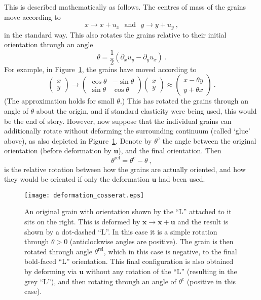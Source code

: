 \documentclass[]{scrreprt}
\newcommand{\mand}{\ \ \ \mbox{and}\ \ \ }
\newcommand{\pl}{\partial}
\newcommand{\ha}{\mbox{$\frac{1}{2}$}}
\newcommand{\thetac}{\theta^{\mathrm{c}}}
\newcommand{\thetarel}{\theta^{\mathrm{rel}}}
\begin{document}
This is described mathematically as follows.  The centres of mass of
the grains move according to
$$
x \rightarrow x + u_{x} \mand y\rightarrow y+ u_{y} \ ,
$$
in the standard way.  This also rotates the grains relative to their
initial orientation through an angle
$$
\theta = \ha(\pl_{x}u_{y}-\pl_{y}u_{x}) \ .
$$
For example, in Figure~\ref{deformation_cosserat.fig}, the grains have
moved according to
\begin{equation}
\left(\begin{array}{c}x\\y\end{array}\right) \rightarrow
\left(\begin{array}{cc}\cos\theta & -\sin\theta \\ \sin\theta & \cos\theta
\end{array}\right) 
\left(\begin{array}{c}x\\y\end{array}\right) 
\approx
\left(\begin{array}{c}x - \theta y\\y + \theta x\end{array}\right)   \ .
\label{rigid.rot.eqn}
\end{equation}
(The approximation holds for small $\theta$.)  This has rotated the
grains through an angle of $\theta$ about the origin, and if standard
elasticity were being used, this would be the end of story.  However,
now suppose that the individual grains can additionally rotate without
deforming the surrounding continuum (called `glue' above), as also
depicted in Figure~\ref{deformation_cosserat.fig}.  Denote by
$\thetac$ the angle between the original orientation (before
deformation by ${\mathbf u}$), and the final orientation.  Then
$$
\thetarel = \thetac - \theta \ ,
$$
is the relative rotation between how the grains are actually oriented,
and how they would be oriented if only the deformation ${\mathbf u}$
had been used.

\begin{figure}[htb]
\begin{center}
\texttt{[image: deformation\_cosserat.eps]}
\caption{An original grain with orientation shown by the ``L''
  attached to it sits on the right.  This is deformed by ${\mathbf
  x}\rightarrow {\mathbf x}+{\mathbf u}$ and the result is shown by a
  dot-dashed ``L''.  In this case it is a simple rotation through
  $\theta>0$ (anticlockwise angles are positive).  The grain is then
  rotated through angle $\thetarel$, which in this case is negative, to
  the final bold-faced ``L'' orientation.  This final configuration is
  also obtained by deforming via ${\mathbf u}$ without any rotation of
  the ``L'' (resulting in the grey ``L''), and then rotating through
  an angle of $\thetac$ (positive in this case).}
\label{deformation_cosserat.fig}
\end{center}
\end{figure}
\end{document}

